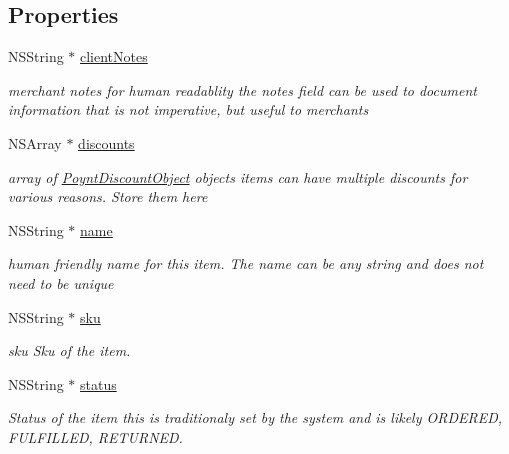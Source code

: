 \subsection*{Properties}
\begin{DoxyCompactItemize}
\item 
N\+S\+String $\ast$ \hyperlink{interface_poynt_order_item_object_a1748706da6a2d9e7513e0075dadfc348}{client\+Notes}
\begin{DoxyCompactList}\small\item\em merchant notes for human readablity  the notes field can be used to document information that is not imperative, but useful to merchants \end{DoxyCompactList}\item 
N\+S\+Array $\ast$ \hyperlink{interface_poynt_order_item_object_a203259381417b0a34916ce3f864161c2}{discounts}
\begin{DoxyCompactList}\small\item\em array of \hyperlink{interface_poynt_discount_object}{Poynt\+Discount\+Object} objects  items can have multiple discounts for various reasons. Store them here \end{DoxyCompactList}\item 
N\+S\+String $\ast$ \hyperlink{interface_poynt_order_item_object_a4b93d352d2fca75b34e1b5a50e03f587}{name}
\begin{DoxyCompactList}\small\item\em human friendly name for this item.  The name can be any string and does not need to be unique \end{DoxyCompactList}\item 
N\+S\+String $\ast$ \hyperlink{interface_poynt_order_item_object_a40fae7616715aeb5f241af769a5f55b4}{sku}
\begin{DoxyCompactList}\small\item\em sku  Sku of the item. \end{DoxyCompactList}\item 
N\+S\+String $\ast$ \hyperlink{interface_poynt_order_item_object_ac2acf327011ce6ed9e26a41ceddaee31}{status}
\begin{DoxyCompactList}\small\item\em Status of the item  this is traditionaly set by the system and is likely \textquotesingle{}O\+R\+D\+E\+R\+ED\textquotesingle{}, \textquotesingle{}F\+U\+L\+F\+I\+L\+L\+ED\textquotesingle{}, \textquotesingle{}R\+E\+T\+U\+R\+N\+ED\textquotesingle{}. \end{DoxyCompactList}\item 

\end{DoxyCompactItemize}
